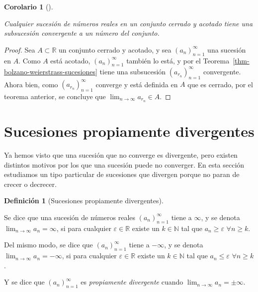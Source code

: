 \documentclass[
  a4paper,
]{scrreport}
\theoremstyle{definition}
\theoremstyle{plain}
\newtheorem{corollary}{Corolario}[chapter]
\theoremstyle{definition}
\newtheorem{definition}{Definición}[chapter]
\theoremstyle{definition}
\theoremstyle{plain}
\theoremstyle{plain}
\theoremstyle{remark}
\begin{document}
\begin{corollary}[]\protect\hypertarget{cor-sucesiones-conjuntos-cerrados-acotados}{}\label{cor-sucesiones-conjuntos-cerrados-acotados}

Cualquier sucesión de números reales en un conjunto cerrado y acotado
tiene una subsucesión convergente a un número del conjunto.

\end{corollary}

\begin{tcolorbox}[enhanced jigsaw, leftrule=.75mm, colbacktitle=quarto-callout-note-color!10!white, toprule=.15mm, opacityback=0, opacitybacktitle=0.6, toptitle=1mm, breakable, bottomtitle=1mm, colframe=quarto-callout-note-color-frame, rightrule=.15mm, titlerule=0mm, title=\textcolor{quarto-callout-note-color}{\faInfo}\hspace{0.5em}{Demostración}, arc=.35mm, left=2mm, bottomrule=.15mm, colback=white, coltitle=black]

\begin{proof}
Sea \(A\subset \mathbb{R}\) un conjunto cerrado y acotado, y sea
\((a_n)_{n=1}^\infty\) una sucesión en \(A\). Como \(A\) está acotado,
\((a_n)_{n=1}^\infty\) también lo está, y por el
Teorema~\ref{thm-bolzano-weierstrass-sucesiones} tiene una subsucesión
\((a_{r_n})_{n=1}^\infty\) convergente. Ahora bien, como
\((a_{r_n})_{n=1}^\infty\) converge y está definida en \(A\) que es
cerrado, por el teorema anterior, se concluye que
\(\lim_{n\to\infty}a_{r_n}\in A\).
\end{proof}

\end{tcolorbox}

\section{Sucesiones propiamente
divergentes}\label{sucesiones-propiamente-divergentes}

Ya hemos visto que una sucesión que no converge es divergente, pero
existen distintos motivos por los que una sucesión puede no converger.
En esta sección estudiamos un tipo particular de sucesiones que divergen
porque no paran de crecer o decrecer.

\begin{definition}[Sucesiones propiamente
divergentes]\protect\hypertarget{def-sucesiones-propiamente-divergentes}{}\label{def-sucesiones-propiamente-divergentes}

Se dice que una sucesión de números reales \((a_n)_{n=1}^\infty\) tiene
a \(\infty\), y se denota \(\lim_{n\to\infty}a_n=\infty\), si para
cualquier \(\varepsilon\in\mathbb{R}\) existe un \(k\in\mathbb{N}\) tal
que \(a_n\geq\varepsilon\) \(\forall n\geq k\).

Del mismo modo, se dice que \((a_n)_{n=1}^\infty\) tiene a \(-\infty\),
y se denota \(\lim_{n\to\infty}a_n=-\infty\), si para cualquier
\(\varepsilon\in\mathbb{R}\) existe un \(k\in\mathbb{N}\) tal que
\(a_n\leq \varepsilon\) \(\forall n\geq k\).

Y se dice que \((a_n)_{n=1}^\infty\) es \emph{propiamente divergente}
cuando \(\lim_{n\to\infty}a_n=\pm\infty\).

\end{definition}
\end{document}
